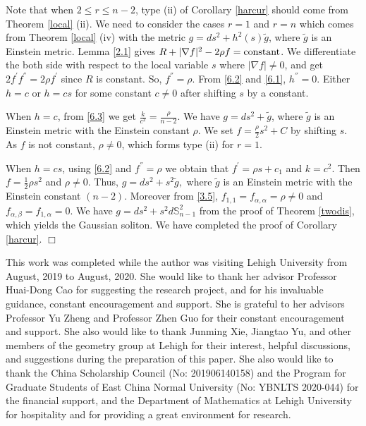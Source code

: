 \documentclass{amsart}
\theoremstyle{definition}
\theoremstyle{remark}
\numberwithin{equation}{section}
\begin{document}
Note that when $2 \leq r \leq n-2$, type
{\rm (ii)} of Corollary \ref{harcur} should come from Theorem \ref{local} {\rm (ii)}.
We need to consider the cases $r=1$ and $r=n$ which comes from Theorem \ref{local} {\rm (iv)} 
with the metric $ g=ds^2 + h^2(s) \tilde{g}$,
where $\tilde{g}$ is an Einstein metric.
Lemma \ref{2.1} gives $R +|\nabla f|^2 - 2\rho f = {\rm constant}$.
We differentiate the both side with respect to the local variable $s$ where $|\nabla f| \neq 0$, 
and get $2 f^{'} f^{''} = 2\rho f^{'}$ since $R$ is constant. 
So, $f^{''} = \rho$.  From \eqref{6.2} and \eqref{6.1}, $h^{''} =0$.
Either $h=c$ or $h=cs$ for some constant $c\neq 0$ after shifting $s$ by a constant.

When $h=c$, from \eqref{6.3} we get $\frac{k}{c^2} = \frac{\rho}{n-2}$. 
We have $g = ds^2 + \tilde{g}$, where $\tilde{g}$ is an Einstein metric
with the Einstein constant $\rho$. We set $f= \frac{\rho}{2} s^2+C$ by shifting $s$.
As $f$ is not constant, $\rho \neq 0$, which forms type {\rm (ii)} for $r=1$.  

When $h=cs$, using \eqref{6.2} and $f^{''} = \rho $ 
we obtain that $f^{'} = \rho s+c_1$ and $k= c^2$. Then $f= \frac{1}{2}\rho s^2$ and
$\rho \neq 0$.
Thus, $g = ds^2 + s^2 \tilde{g}, $ where $\tilde{g}$ is an Einstein metric
with the Einstein constant $(n-2)$. 
Moreover
from \eqref{3.5},
$f_{1,1}=f_{\alpha,\alpha}=\rho\neq0$ and $f_{\alpha,\beta}=f_{1,\alpha}=0$. 
We have $g=ds^2 + s^2d\mathbb{S}^2_{n-1}$ from the proof of Theorem \ref{twodis},
which yields the Gaussian soliton.
We have completed the proof of Corollary \ref{harcur}. 
\hfill $\Box$

\medskip
	This work was completed while the author was visiting Lehigh University from August, 2019 to August, 2020. 
	She would like to thank her advisor Professor Huai-Dong Cao  
	for suggesting the research project, and for his invaluable guidance, constant encouragement and support.
	She is grateful to her advisors Professor Yu Zheng and Professor Zhen Guo for their constant encouragement and support.
	She also would like to thank Junming Xie, Jiangtao Yu, and other members of the geometry group at Lehigh for their interest, 
    helpful discussions, and suggestions during the preparation of this paper. 
    She also would like to thank the China Scholarship Council (No: 201906140158)
    and the Program for Graduate Students of East China Normal University (No: YBNLTS 2020-044)
    for the financial support, and the Department of Mathematics at Lehigh University
    for hospitality and for providing a great environment for research. 
\end{document}
